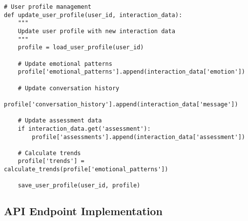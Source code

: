\begin{verbatim}
# User profile management
def update_user_profile(user_id, interaction_data):
    """
    Update user profile with new interaction data
    """
    profile = load_user_profile(user_id)
    
    # Update emotional patterns
    profile['emotional_patterns'].append(interaction_data['emotion'])
    
    # Update conversation history
    profile['conversation_history'].append(interaction_data['message'])
    
    # Update assessment data
    if interaction_data.get('assessment'):
        profile['assessments'].append(interaction_data['assessment'])
    
    # Calculate trends
    profile['trends'] = calculate_trends(profile['emotional_patterns'])
    
    save_user_profile(user_id, profile)
\end{verbatim}

\subsection{API Endpoint Implementation}

